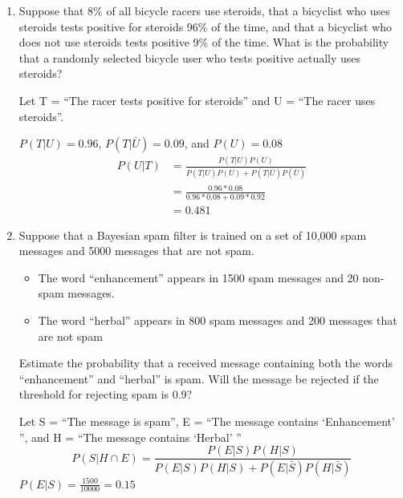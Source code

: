 \documentclass[12pt]{article}
\let\intersect\cap
\newenvironment{answer}{\larger[2]}{}
\begin{document}
\begin{enumerate}
\begin{enumerate}[itemsep=\fill,after=\vfill]
\end{enumerate}

\newpage



\item Suppose that 8\% of all bicycle racers use steroids, that a bicyclist who
uses steroids tests positive for steroids 96\% of the time, and that a bicyclist
who does not use steroids tests positive 9\% of the time. What is the
probability that a randomly selected bicycle user who tests positive actually
uses steroids?

\begin{answer}
Let T = ``The racer tests positive for steroids'' and U = ``The racer uses steroids''.

$P(T|U) = 0.96$, $P(T|\bar{U}) = 0.09$, and $P(U) = 0.08$
%
\begin{align*}
P(U|T) &= \frac{P(T|U)P(U)}{P(T|U)P(U) + P(T|\bar{U})P(\bar{U})} \\
&=\frac{0.96*0.08}{0.96*0.08+0.09*0.92} \\
&= 0.481
\end{align*}
\end{answer}

\vfill



\item Suppose that a Bayesian spam filter is trained on a set of 10,000 spam messages and 5000 messages that are not spam.
%
\begin{itemize}

\item The word ``enhancement'' appears in 1500 spam messages and 20 non-spam messages.

\item The word ``herbal'' appears in 800 spam messages and 200 messages that are not spam

\end{itemize}
%
Estimate the probability that a received message containing both the words
``enhancement'' and ``herbal'' is spam. Will the message be rejected if the
threshold for rejecting spam is 0.9?

\begin{answer}
Let S = ``The message is spam'', E = ``The message contains `Enhancement' '', and H = ``The message contains `Herbal' ''
%
\begin{equation*}
P(S|H \intersect E) = \frac{P(E|S)P(H|S)}{P(E|S)P(H|S)+P(E|\bar{S})P(H|\bar{S})}
\end{equation*}
%
$P(E|S) = \frac{1500}{10000} = 0.15$


\end{answer}
\end{enumerate}
\end{document}
